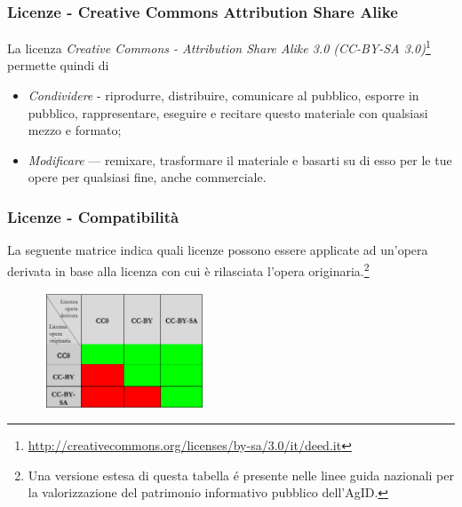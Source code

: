 \documentclass[8pt]{beamer}
\begin{document}
\begin{frame}
\frametitle{Licenze - Creative Commons Attribution Share Alike}
La licenza \emph{Creative Commons - Attribution Share Alike 3.0 (CC-BY-SA 3.0)}\footnote{\url{http://creativecommons.org/licenses/by-sa/3.0/it/deed.it}}
permette quindi di
\begin{itemize}
 \item \emph{Condividere} - riprodurre, distribuire, comunicare al pubblico, esporre in pubblico, 
 rappresentare, eseguire e recitare questo materiale con qualsiasi mezzo e formato;
 \item \emph{Modificare} — remixare, trasformare il materiale e basarti su di esso per le tue opere
per qualsiasi fine, anche commerciale.
\end{itemize}


\end{frame}

\begin{frame}
\frametitle{Licenze - Compatibilit\`a}
  La seguente matrice indica quali licenze possono essere applicate ad un'opera derivata
  in base alla licenza con cui \`e rilasciata l'opera originaria.\footnote{Una versione estesa di questa tabella \'e presente nelle
  linee guida nazionali per la valorizzazione del patrimonio informativo pubblico dell'AgID.} 
  \begin{figure}
    \includegraphics[width=180px]{compatibilita_licenze.png} 
  \end{figure}
\end{frame}
\end{document}
